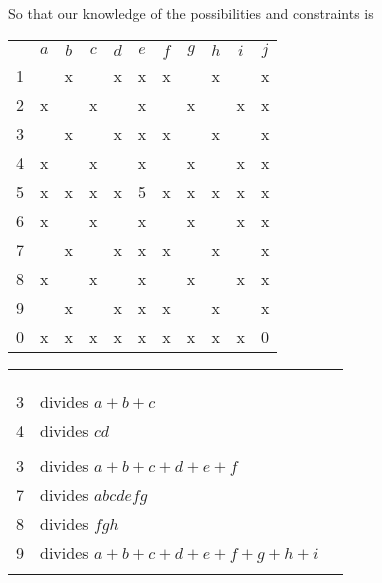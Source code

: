 So that our knowledge of the possibilities and constraints is
\begin{center}
\begin{tabular}{ccccccccccc}
			&	$a$	&	$b$	&	$c$	&	$d$	&	$e$	&	$f$	&	$g$	&	$h$	&	$i$	&	$j$	\\
	1		&		&	x	&		&	x	&	x	&	x	&		&	x	&		&	x	\\
	2		&	x	&		&	x	&		&	x	&		&	x	&		&	x	&	x	\\
	3		&		&	x	&		&	x	&	x	&	x	&		&	x	&		&	x	\\
	4		&	x	&		&	x	&		&	x	&		&	x	&		&	x	&	x	\\
	5		&	x	&	x	&	x	&	x	&	5	&	x	&	x	&	x	&	x	&	x	\\
	6		&	x	&		&	x	&		&	x	&		&	x	&		&	x	&	x	\\
	7		&		&	x	&		&	x	&	x	&	x	&		&	x	&		&	x	\\
	8		&	x	&		&	x	&		&	x	&		&	x	&		&	x	&	x	\\
	9		&		&	x	&		&	x	&	x	&	x	&		&	x	&		&	x	\\
	0		&	x	&	x	&	x	&	x	&	x	&	x	&	x	&	x	&	x	&	0	\\
\end{tabular}
\hspace{1cm}\vline\hspace{1cm}
\begin{tabular}{rll}
	& 		\\
	& 		\\
	& 		\\
	3	&	divides $a+b+c$					\\
	4	&	divides $cd$					\\
		&	\\
	3	&	divides $a+b+c+d+e+f$			\\
	7	&	divides $abcdefg$				\\
	8	&	divides $fgh$					\\
	9	&	divides $a+b+c+d+e+f+g+h+i$		\\
		&	
\end{tabular}
\end{center}

